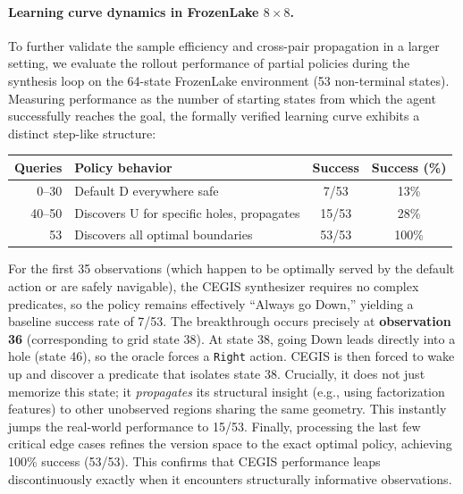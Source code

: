 \paragraph{Learning curve dynamics in FrozenLake $8{\times}8$.}
To further validate the sample efficiency and cross-pair propagation in a larger setting, we evaluate the rollout performance of partial policies during the synthesis loop on the 64-state FrozenLake environment (53 non-terminal states). Measuring performance as the number of starting states from which the agent successfully reaches the goal, the formally verified learning curve exhibits a distinct step-like structure:
\begin{center}
\small
\begin{tabular}{@{}rlcc@{}}
\textbf{Queries} & \textbf{Policy behavior} & \textbf{Success} & \textbf{Success (\%)} \\
\hline
0--30 & Default D everywhere safe & 7/53 & 13\% \\
40--50 & Discovers U for specific holes, propagates & 15/53 & 28\% \\
53 & Discovers all optimal boundaries & 53/53 & 100\% \\
\end{tabular}
\end{center}
For the first 35 observations (which happen to be optimally served by the default action or are safely navigable), the CEGIS synthesizer requires no complex predicates, so the policy remains effectively ``Always go Down,'' yielding a baseline success rate of 7/53. The breakthrough occurs precisely at \textbf{observation 36} (corresponding to grid state 38). At state 38, going Down leads directly into a hole (state 46), so the oracle forces a \texttt{Right} action. CEGIS is then forced to wake up and discover a predicate that isolates state 38. Crucially, it does not just memorize this state; it \emph{propagates} its structural insight (e.g., using factorization features) to other unobserved regions sharing the same geometry. This instantly jumps the real-world performance to 15/53. Finally, processing the last few critical edge cases refines the version space to the exact optimal policy, achieving 100\% success (53/53). This confirms that CEGIS performance leaps discontinuously exactly when it encounters structurally informative observations.

